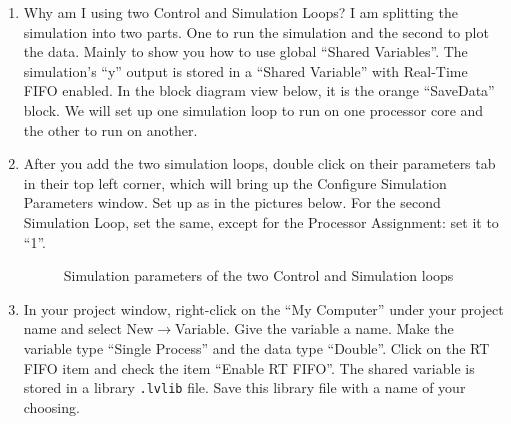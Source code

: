 \documentclass[11pt]{article}
\begin{document}
\begin{enumerate}
    \item Why am I using two Control and Simulation Loops? I am splitting the simulation into two parts. One to run the simulation and the second to plot the data. Mainly to show you how to use global “Shared Variables”. The simulation’s “y” output is stored in a “Shared Variable” with Real-Time FIFO enabled. In the block diagram view below, it is the orange “SaveData” block. We will set up one simulation loop to run on one processor core and the other to run on another.
    \item After you add the two simulation loops, double click on their parameters tab in their top left corner, which will bring up the Configure Simulation Parameters window. Set up as in the pictures below. For the second Simulation Loop, set the same, except for the Processor Assignment: set it to “1”.
        \begin{figure}[H]
            \centering
            \begin{subfigure}[b]{0.485\linewidth}
                \centering
            \end{subfigure}
            \begin{subfigure}[b]{0.485\linewidth}
                \centering
            \end{subfigure}
            \caption{Simulation parameters of the two Control and Simulation loops}
        \end{figure}
    \item In your project window, right-click on the “My Computer” under your project name and select New$\rightarrow$Variable. Give the variable a name. Make the variable type “Single Process” and the data type “Double”. Click on the RT FIFO item and check the item “Enable RT FIFO”. The shared variable is stored in a library \lstinline|.lvlib| file. Save this library file with a name of your choosing.

\end{enumerate}
\end{document}
